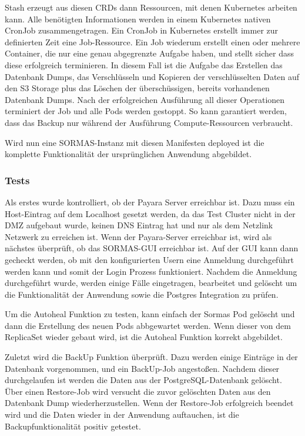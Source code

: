 Stash erzeugt aus diesen \ac{CRD}s dann Ressourcen, mit denen Kubernetes arbeiten kann.
Alle benötigten Informationen werden in einem Kubernetes nativen CronJob zusammengetragen.
Ein CronJob in Kubernetes erstellt immer zur definierten Zeit eine Job-Ressource. 
Ein Job wiederum erstellt einen oder mehrere Container, die nur eine genau abgegrenzte Aufgabe haben, und stellt sicher dass diese erfolgreich terminieren. 
In diesem Fall ist die Aufgabe das Erstellen das Datenbank Dumps, das Verschlüsseln und Kopieren der verschlüsselten Daten auf den \ac{S3} Storage plus das Löschen der überschüssigen, bereits vorhandenen Datenbank Dumps.
Nach der erfolgreichen Ausführung all dieser Operationen terminiert der Job und alle Pods werden gestoppt. 
So kann garantiert werden, dass das Backup nur während der Ausführung Compute-Ressourcen verbraucht. 

Wird nun eine \ac{SORMAS}-Instanz mit diesen Manifesten deployed ist die komplette Funktionalität der ursprünglichen Anwendung abgebildet.

\subsubsection{Tests}
\label{ref:tests}
Als erstes wurde kontrolliert, ob der Payara Server erreichbar ist.
Dazu muss ein Host-Eintrag auf dem Localhost gesetzt werden, da das Test Cluster nicht in der \ac{DMZ} aufgebaut wurde, keinen \ac{DNS} Eintrag hat und nur als dem Netzlink Netzwerk zu erreichen ist. 
Wenn der Payara-Server erreichbar ist, wird als nächstes überprüft, ob das \ac{SORMAS}-\ac{GUI} erreichbar ist.
Auf der \ac{GUI} kann dann gecheckt werden, ob mit den konfigurierten Usern eine Anmeldung durchgeführt werden kann und somit der Login Prozess funktioniert.
Nachdem die Anmeldung durchgeführt wurde, werden einige Fälle eingetragen, bearbeitet und gelöscht um die Funktionalität der Anwendung sowie die Postgres Integration zu prüfen.

Um die Autoheal Funktion zu testen, kann einfach der Sormas Pod gelöscht und dann die Erstellung des neuen Pods abbgewartet werden.
Wenn dieser von dem ReplicaSet wieder gebaut wird, ist die Autoheal Funktion korrekt abgebildet.

Zuletzt wird die BackUp Funktion überprüft.
Dazu werden einige Einträge in der Datenbank vorgenommen, und ein BackUp-Job angestoßen. 
Nachdem dieser durchgelaufen ist werden die Daten aus der PostgreSQL-Datenbank gelöscht.
Über einen Restore-Job wird versucht die zuvor gelöschten Daten aus den Datenbank Dump wiederherzustellen. 
Wenn der Restore-Job erfolgreich beendet wird und die Daten wieder in der Anwendung auftauchen, ist die Backupfunktionalität positiv getestet.


